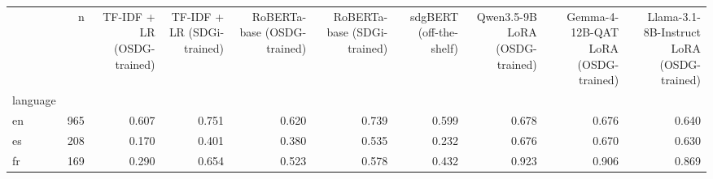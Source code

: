 \begin{tabular}{lrrrrrrrrr}
\toprule
 & n & TF-IDF + LR (OSDG-trained) & TF-IDF + LR (SDGi-trained) & RoBERTa-base (OSDG-trained) & RoBERTa-base (SDGi-trained) & sdgBERT (off-the-shelf) & Qwen3.5-9B LoRA (OSDG-trained) & Gemma-4-12B-QAT LoRA (OSDG-trained) & Llama-3.1-8B-Instruct LoRA (OSDG-trained) \\
language &  &  &  &  &  &  &  &  &  \\
\midrule
en & 965 & 0.607 & 0.751 & 0.620 & 0.739 & 0.599 & 0.678 & 0.676 & 0.640 \\
es & 208 & 0.170 & 0.401 & 0.380 & 0.535 & 0.232 & 0.676 & 0.670 & 0.630 \\
fr & 169 & 0.290 & 0.654 & 0.523 & 0.578 & 0.432 & 0.923 & 0.906 & 0.869 \\
\bottomrule
\end{tabular}
